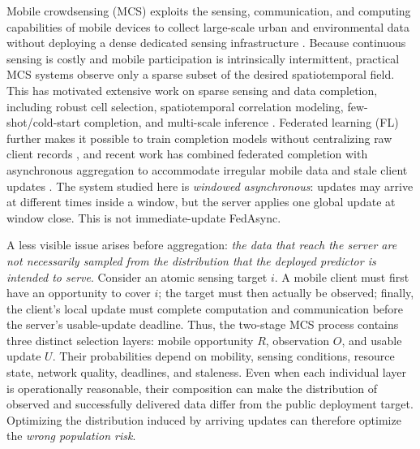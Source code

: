 \documentclass[letterpaper,journal]{IEEEtran}
\begin{document}
Mobile crowdsensing (MCS) exploits the sensing, communication, and computing
capabilities of mobile devices to collect large-scale urban and environmental
data without deploying a dense dedicated sensing infrastructure
\cite{ganti2011mobile,guo2015mobile,ma2014opportunities}.  Because
continuous sensing is costly and mobile participation is intrinsically
intermittent, practical MCS systems observe only a sparse subset of the desired
spatiotemporal field.  This has motivated extensive work on sparse sensing and
data completion, including robust cell selection, spatiotemporal correlation
modeling, few-shot/cold-start completion, and multi-scale inference
\cite{wang2023outlier,li2024robust,wang2023transformer,wang2024fewshot,wang2025evolutionary,xu2025rethinking,liu2026pyramid,zhang2026mapt}.
Federated learning (FL) further makes it possible to train completion models
without centralizing raw client records
\cite{mcmahan2017communication,yang2019federated,kairouz2021advances,li2020federated},
and recent work has combined federated completion with asynchronous aggregation
to accommodate irregular mobile data and stale client updates
\cite{wang2026federated,xie2019asynchronous,liu2023adaptive,sun2024staleness}.
The system studied here is \emph{windowed asynchronous}: updates may arrive at
different times inside a window, but the server applies one global update at
window close.  This is not immediate-update FedAsync.

A less visible issue arises before aggregation: \emph{the data that reach the
server are not necessarily sampled from the distribution that the deployed
predictor is intended to serve}.  Consider an atomic sensing target $i$.  A
mobile client must first have an opportunity to cover $i$; the target must then
actually be observed; finally, the client's local update must complete
computation and communication before the server's usable-update deadline.
Thus, the two-stage MCS process contains three distinct selection layers:
mobile opportunity $R$, observation $O$, and usable update $U$.  Their
probabilities depend on mobility, sensing conditions, resource state, network
quality, deadlines, and staleness.  Even when each individual layer is
operationally reasonable, their composition can make the distribution of
observed and successfully delivered data differ from the public deployment
target.  Optimizing the distribution induced by arriving updates can therefore
optimize the \emph{wrong population risk}.
\end{document}
